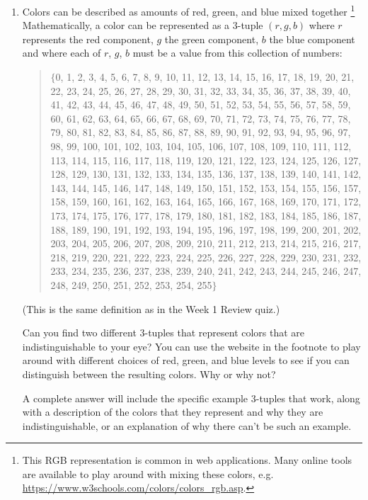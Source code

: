 \documentclass[12pt, oneside]{article}
\begin{document}
\begin{enumerate}[labelindent=0pt, leftmargin=0pt]
\begin{enumerate}[labelindent=0pt, leftmargin=0pt]
        \item
        Colors can be described as amounts of red, green, and blue mixed together
        \footnote{This RGB representation is common in web applications.  Many online tools are available to play around with mixing these colors,  e.g. \url{https://www.w3schools.com/colors/colors_rgb.asp}. }
        Mathematically, a color can be represented as a $3$-tuple $(r, g, b)$ where $r$ represents the red component, $g$ the green component, $b$ the blue component and where each of $r$, $g$, $b$ must be a value from this collection of numbers:
        \begin{quote}
        $\{$0, 1, 2, 3, 4, 5, 6, 7, 8, 9, 10, 11, 12, 13, 14, 15, 16, 17, 18, 19, 20, 21, 22, 23, 24, 25, 26, 27, 28, 29, 30, 31, 32, 33, 34, 35, 36, 37, 38, 39, 40, 41, 42, 43, 44, 45, 46, 47, 48, 49, 50, 51, 52, 53, 54, 55, 56, 57, 58, 59, 60, 61, 62, 63, 64, 65, 66, 67, 68, 69, 70, 71, 72, 73, 74, 75, 76, 77, 78, 79, 80, 81, 82, 83, 84, 85, 86, 87, 88, 89, 90, 91, 92, 93, 94, 95, 96, 97, 98, 99, 100, 101, 102, 103, 104, 105, 106, 107, 108, 109, 110, 111, 112, 113, 114, 115, 116, 117, 118, 119, 120, 121, 122, 123, 124, 125, 126, 127, 128, 129, 130, 131, 132, 133, 134, 135, 136, 137, 138, 139, 140, 141, 142, 143, 144, 145, 146, 147, 148, 149, 150, 151, 152, 153, 154, 155, 156, 157, 158, 159, 160, 161, 162, 163, 164, 165, 166, 167, 168, 169, 170, 171, 172, 173, 174, 175, 176, 177, 178, 179, 180, 181, 182, 183, 184, 185, 186, 187, 188, 189, 190, 191, 192, 193, 194, 195, 196, 197, 198, 199, 200, 201, 202, 203, 204, 205, 206, 207, 208, 209, 210, 211, 212, 213, 214, 215, 216, 217, 218, 219, 220, 221, 222, 223, 224, 225, 226, 227, 228, 229, 230, 231, 232, 233, 234, 235, 236, 237, 238, 239, 240, 241, 242, 243, 244, 245, 246, 247, 248, 249, 250, 251, 252, 253, 254, 255$\}$
        \end{quote}
        (This is the same definition as in the Week 1 Review quiz.)
        
        Can you find two different $3$-tuples that represent colors that are indistinguishable to your eye? You can use the website in the footnote to play around
        with different choices of red, green, and blue levels to see if you can distinguish between the resulting colors.
        Why or why not? 

        A complete answer will include the specific example $3$-tuples that work, along with a description of the colors that they represent and why they
        are indistinguishable, or an explanation of why there can't be such an example.
    \end{enumerate}


\end{enumerate}
\end{document}
